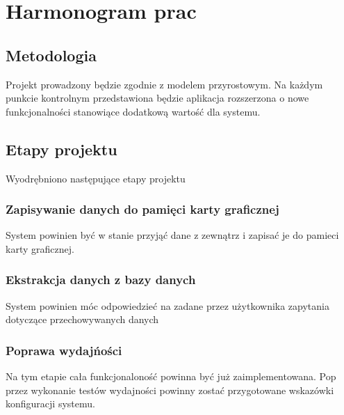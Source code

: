 \documentclass[paper=a4, fontsize=11pt]{scrartcl} %
\numberwithin{equation}{section} %
\numberwithin{figure}{section} %
\numberwithin{table}{section} %
\begin{document}
\section{Harmonogram prac}
    \subsection{Metodologia}
    Projekt prowadzony będzie zgodnie z modelem przyrostowym. Na każdym punkcie kontrolnym przedstawiona będzie
    aplikacja rozszerzona o nowe funkcjonalności stanowiące dodatkową wartość dla systemu.

    \subsection{Etapy projektu}
    Wyodrębniono następujące etapy projektu
        \subsubsection{Zapisywanie danych do pamięci karty graficznej}
            System powinien być w stanie przyjąć dane z zewnątrz i zapisać je do pamieci karty graficznej.
        \subsubsection{Ekstrakcja danych z bazy danych}
            System powinien móc odpowiedzieć na zadane przez użytkownika zapytania dotyczące przechowywanych danych
        \subsubsection{Poprawa wydajńości}
            Na tym etapie cała funkcjonaloność powinna być już zaimplementowana. Pop przez wykonanie testów wydajności
            powinny zostać przygotowane wskazówki konfiguracji systemu.
\end{document}
